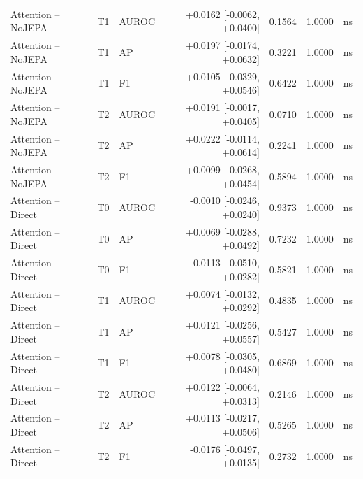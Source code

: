 \begin{table}[t]
\begin{tabular}{lllrrrc}
Attention -- NoJEPA & T1 & AUROC & +0.0162 [-0.0062, +0.0400] & 0.1564 & 1.0000 & ns \\
Attention -- NoJEPA & T1 & AP & +0.0197 [-0.0174, +0.0632] & 0.3221 & 1.0000 & ns \\
Attention -- NoJEPA & T1 & F1 & +0.0105 [-0.0329, +0.0546] & 0.6422 & 1.0000 & ns \\
Attention -- NoJEPA & T2 & AUROC & +0.0191 [-0.0017, +0.0405] & 0.0710 & 1.0000 & ns \\
Attention -- NoJEPA & T2 & AP & +0.0222 [-0.0114, +0.0614] & 0.2241 & 1.0000 & ns \\
Attention -- NoJEPA & T2 & F1 & +0.0099 [-0.0268, +0.0454] & 0.5894 & 1.0000 & ns \\
Attention -- Direct & T0 & AUROC & -0.0010 [-0.0246, +0.0240] & 0.9373 & 1.0000 & ns \\
Attention -- Direct & T0 & AP & +0.0069 [-0.0288, +0.0492] & 0.7232 & 1.0000 & ns \\
Attention -- Direct & T0 & F1 & -0.0113 [-0.0510, +0.0282] & 0.5821 & 1.0000 & ns \\
Attention -- Direct & T1 & AUROC & +0.0074 [-0.0132, +0.0292] & 0.4835 & 1.0000 & ns \\
Attention -- Direct & T1 & AP & +0.0121 [-0.0256, +0.0557] & 0.5427 & 1.0000 & ns \\
Attention -- Direct & T1 & F1 & +0.0078 [-0.0305, +0.0480] & 0.6869 & 1.0000 & ns \\
Attention -- Direct & T2 & AUROC & +0.0122 [-0.0064, +0.0313] & 0.2146 & 1.0000 & ns \\
Attention -- Direct & T2 & AP & +0.0113 [-0.0217, +0.0506] & 0.5265 & 1.0000 & ns \\
Attention -- Direct & T2 & F1 & -0.0176 [-0.0497, +0.0135] & 0.2732 & 1.0000 & ns \\
\bottomrule
\end{tabular}
\end{table}
